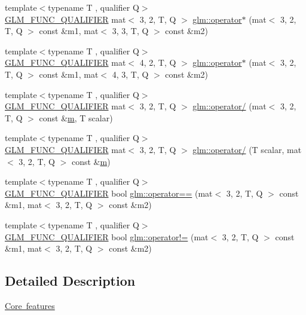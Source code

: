 \begin{DoxyCompactItemize}
\item 
{\footnotesize template$<$typename T , qualifier Q$>$ }\\\mbox{\hyperlink{setup_8hpp_a33fdea6f91c5f834105f7415e2a64407}{G\+L\+M\+\_\+\+F\+U\+N\+C\+\_\+\+Q\+U\+A\+L\+I\+F\+I\+ER}} mat$<$ 3, 2, T, Q $>$ \mbox{\hyperlink{namespaceglm_abe65c51280e69b884cb8b7dbc4886cea}{glm\+::operator$\ast$}} (mat$<$ 3, 2, T, Q $>$ const \&m1, mat$<$ 3, 3, T, Q $>$ const \&m2)
\item 
{\footnotesize template$<$typename T , qualifier Q$>$ }\\\mbox{\hyperlink{setup_8hpp_a33fdea6f91c5f834105f7415e2a64407}{G\+L\+M\+\_\+\+F\+U\+N\+C\+\_\+\+Q\+U\+A\+L\+I\+F\+I\+ER}} mat$<$ 4, 2, T, Q $>$ \mbox{\hyperlink{namespaceglm_aff7e9be9f5a7f1be34879ba617ea4698}{glm\+::operator$\ast$}} (mat$<$ 3, 2, T, Q $>$ const \&m1, mat$<$ 4, 3, T, Q $>$ const \&m2)
\item 
{\footnotesize template$<$typename T , qualifier Q$>$ }\\\mbox{\hyperlink{setup_8hpp_a33fdea6f91c5f834105f7415e2a64407}{G\+L\+M\+\_\+\+F\+U\+N\+C\+\_\+\+Q\+U\+A\+L\+I\+F\+I\+ER}} mat$<$ 3, 2, T, Q $>$ \mbox{\hyperlink{namespaceglm_af36636be791cabfa4c7c74b5e4c34750}{glm\+::operator/}} (mat$<$ 3, 2, T, Q $>$ const \&\mbox{\hyperlink{_s_d_l__opengl__glext_8h_af593500c283bf1a787a6f947f503a5c2}{m}}, T scalar)
\item 
{\footnotesize template$<$typename T , qualifier Q$>$ }\\\mbox{\hyperlink{setup_8hpp_a33fdea6f91c5f834105f7415e2a64407}{G\+L\+M\+\_\+\+F\+U\+N\+C\+\_\+\+Q\+U\+A\+L\+I\+F\+I\+ER}} mat$<$ 3, 2, T, Q $>$ \mbox{\hyperlink{namespaceglm_afeb27aabe46abc6835401face3676a6e}{glm\+::operator/}} (T scalar, mat$<$ 3, 2, T, Q $>$ const \&\mbox{\hyperlink{_s_d_l__opengl__glext_8h_af593500c283bf1a787a6f947f503a5c2}{m}})
\item 
{\footnotesize template$<$typename T , qualifier Q$>$ }\\\mbox{\hyperlink{setup_8hpp_a33fdea6f91c5f834105f7415e2a64407}{G\+L\+M\+\_\+\+F\+U\+N\+C\+\_\+\+Q\+U\+A\+L\+I\+F\+I\+ER}} bool \mbox{\hyperlink{namespaceglm_a14d8fbb4720478f04b7d69ceab4257a8}{glm\+::operator==}} (mat$<$ 3, 2, T, Q $>$ const \&m1, mat$<$ 3, 2, T, Q $>$ const \&m2)
\item 
{\footnotesize template$<$typename T , qualifier Q$>$ }\\\mbox{\hyperlink{setup_8hpp_a33fdea6f91c5f834105f7415e2a64407}{G\+L\+M\+\_\+\+F\+U\+N\+C\+\_\+\+Q\+U\+A\+L\+I\+F\+I\+ER}} bool \mbox{\hyperlink{namespaceglm_a72389094ef9ca699c284e34a56573b07}{glm\+::operator!=}} (mat$<$ 3, 2, T, Q $>$ const \&m1, mat$<$ 3, 2, T, Q $>$ const \&m2)
\end{DoxyCompactItemize}


\subsection{Detailed Description}
\mbox{\hyperlink{group__core}{Core features}} 